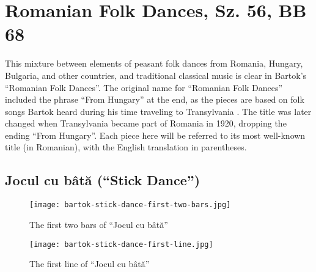 \section{Romanian Folk Dances, Sz. 56, BB 68}

This mixture between elements of peasant folk dances from Romania, Hungary, Bulgaria, and other countries, and traditional classical music is clear in Bartok's ``Romanian Folk Dances''. The original name for ``Romanian Folk Dances'' included the phrase ``From Hungary'' at the end, as the pieces are based on folk songs Bartok heard during his time traveling to Transylvania \autocite{Burkholder_Grout_Palisca_2014}. The title was later changed when Transylvania became part of Romania in 1920, dropping the ending ``From Hungary''. Each piece here will be referred to its most well-known title (in Romanian), with the English translation in parentheses.

\subsection{Jocul cu bâtă (``Stick Dance'')}

\begin{figure}
  \centering
  \texttt{[image: bartok-stick-dance-first-two-bars.jpg]}
  \caption[The first two bars, in ``Jocul cu bâtă'' of  Bartok's \textit{Romanian Folk Dances} Sz. 56, BB 68]{The first two bars of ``Jocul cu bâtă''}
  \label{fig:bartok-stick-dance-first-two-bars}
\end{figure}

\begin{figure}
  \centering
  \texttt{[image: bartok-stick-dance-first-line.jpg]}
  \caption[The first line of ``Jocul cu bâtă'' of Bartok's \textit{Romanian Folk Dances} Sz. 56, BB 68]{The first line of ``Jocul cu bâtă''}
  \label{fig:bartok-stick-dance-first-line}
\end{figure}


